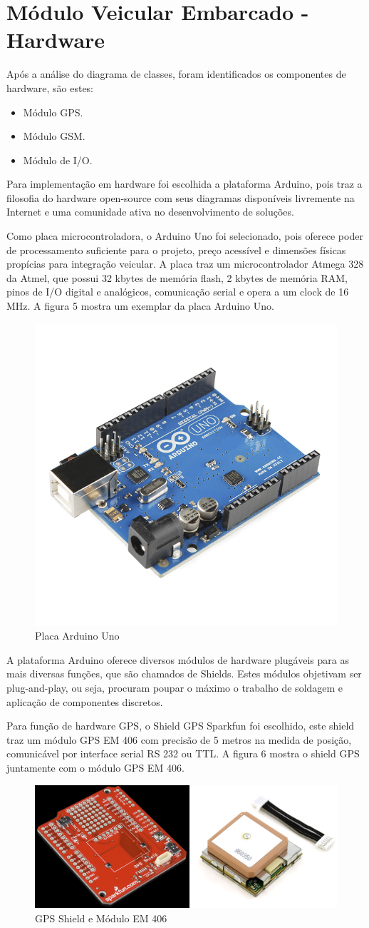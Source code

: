 \section{Módulo Veicular Embarcado - Hardware}
Após a análise do diagrama de classes, foram identificados os componentes de hardware,
são estes:
\begin{itemize}
	\item Módulo GPS.
	\item Módulo GSM.
	\item Módulo de I/O.
\end{itemize}
Para implementação em hardware foi escolhida a plataforma Arduino, pois
traz a filosofia do hardware open-source com seus diagramas disponíveis 
livremente na Internet e uma comunidade ativa no desenvolvimento de soluções.

Como placa microcontroladora, o Arduino Uno foi selecionado, pois oferece
poder de processamento suficiente para o projeto, preço acessível e dimensões
físicas propícias para integração veicular. A placa traz um microcontrolador
Atmega 328 da Atmel, que possui 32 kbytes de memória flash, 2 kbytes de memória
RAM, pinos de I/O digital e analógicos, comunicação serial e opera a um clock de
16 MHz. A figura 5 mostra um exemplar da placa Arduino Uno.

\begin{figure}[!htb]
\centering
\includegraphics[width=3.00cm\textwidth]{figures/arduinoUno.jpg}
\caption{Placa Arduino Uno}
\label{Figura 5}
\end{figure}

A plataforma Arduino oferece diversos módulos de hardware plugáveis
para as mais diversas funções, que são chamados de Shields. Estes módulos
objetivam ser plug-and-play, ou seja, procuram poupar o máximo o trabalho
de soldagem e aplicação de componentes discretos.

Para função de hardware GPS, o Shield GPS Sparkfun foi escolhido, este shield
traz um módulo GPS EM 406 com precisão de 5 metros na medida de posição, comunicável
por interface serial RS 232 ou TTL. A figura 6 mostra o shield GPS juntamente com o 
módulo GPS EM 406.

\begin{figure}[!htb]
\centering
\includegraphics[width=7.00cm\textwidth]{figures/6_gps.png}
\caption{GPS Shield e Módulo EM 406}
\label{Figura 6}
\end{figure}

